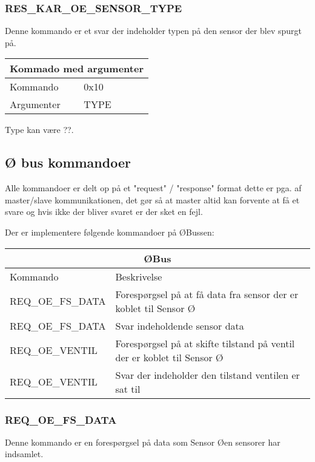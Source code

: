 \subsubsection{RES\_KAR\_OE\_SENSOR\_TYPE}
Denne kommando er et svar der indeholder typen på den sensor der blev spurgt på.

\begin{table}[H]
\setlength{\parindent}{12pt}
\begin{tabular}{|l|lcc|}
\hline
\multicolumn{4}{|c|}{Kommado med argumenter}\\\hline
Kommando & 0x10 & & \\
Argumenter & TYPE & & \\\hline
\end{tabular}
\end{table}

Type kan være ??.

\subsection{Ø bus kommandoer}
Alle kommandoer er delt op på et "request" / "response" format dette er pga. af master/slave kommunikationen, det gør så at master altid kan forvente at få et svare og hvis ikke der bliver svaret er der sket en fejl.

Der er implementere følgende kommandoer på ØBussen:

\begin{table}[H]
\setlength{\parindent}{12pt}
\begin{tabular}{|l|l|}\hline
\multicolumn{2}{|c|}{ØBus\cellcolor[gray]{0.7}}\\\hline
Kommando & Beskrivelse \\\hline
REQ\_OE\_FS\_DATA 		& Forespørgsel på at få data fra sensor der er koblet til Sensor Ø \\\hline 
REQ\_OE\_FS\_DATA 		& Svar indeholdende sensor data								 \\\hline 
REQ\_OE\_VENTIL	   		& Forespørgsel på at skifte tilstand på ventil der er koblet til Sensor Ø \\\hline 
REQ\_OE\_VENTIL       		& Svar der indeholder den tilstand ventilen er sat til \\\hline 
\end{tabular}
\end{table}

\subsubsection{REQ\_OE\_FS\_DATA}
Denne kommando er en forespørgsel på data som Sensor Øen sensorer har indsamlet.

